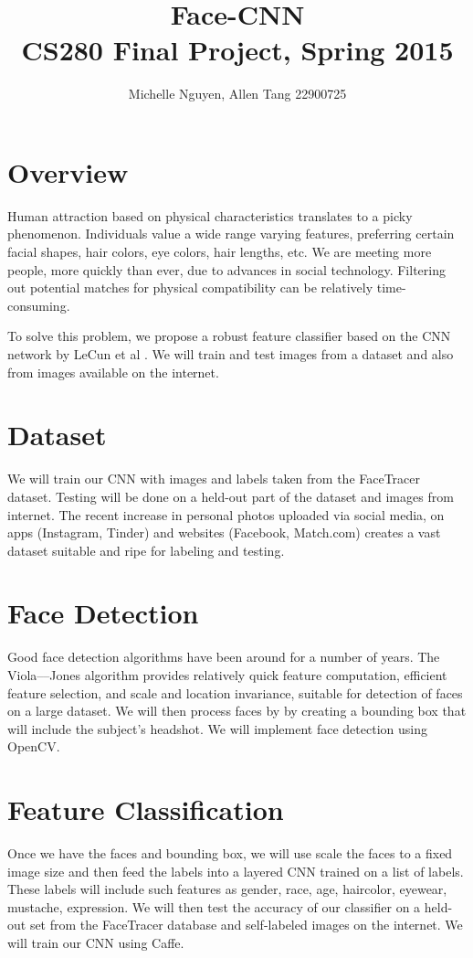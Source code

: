 \documentclass[letterpaper,10pt, twocolumn]{article}
\begin{document}
\title{\vspace{-2.5cm} \textbf{Face-CNN} \\ \normalsize CS280 Final Project, Spring 2015}
\author{Michelle Nguyen, Allen Tang 22900725}
\date{}

\maketitle

\section{Overview}
	Human attraction based on physical characteristics translates to a picky phenomenon. Individuals value a wide range varying features, preferring certain facial shapes, hair colors, eye colors, hair lengths, etc. We are meeting more people, more quickly than ever, due to advances in social technology. Filtering out potential matches for physical compatibility can be relatively time-consuming.
	
	To solve this problem, we propose a robust feature classifier based on the CNN network by LeCun et al \cite{LeCun}. We will train and test images from a dataset and also from images available on the internet.

\section{Dataset}
We will train our CNN with images and labels taken from the FaceTracer dataset\cite{FaceTracer}. Testing will be done on a held-out part of the dataset and images from internet. The recent increase in personal photos uploaded via social media, on apps (Instagram, Tinder) and websites (Facebook, Match.com) creates a vast dataset suitable and ripe for labeling and testing.


\section{Face Detection}
	Good face detection algorithms have been around for a number of years. The Viola–--Jones algorithm provides relatively quick feature computation, efficient feature selection, and scale and location invariance, suitable for detection of faces on a large dataset.  We will then process faces by by creating a bounding box that will include the subject's headshot. We will implement face detection using OpenCV.

\section{Feature Classification}
	Once we have the faces and bounding box, we will use scale the faces to a fixed image size and then feed the labels into a layered CNN trained on a list of labels. These labels will include such features as gender, race, age, hair\textunderscore color, eye\textunderscore wear, mustache, expression. We will then test the accuracy of our classifier on a held-out set from the FaceTracer database and self-labeled images on the internet. We will train our CNN using Caffe.
\end{document}
